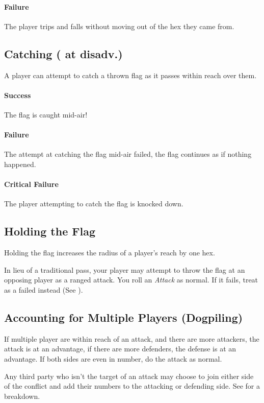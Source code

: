 \paragraph{Failure}
The player trips and falls without moving out of the hex they came from.

\subsection{Catching (\agility{} at disadv.)}\label{sec:catching}
A player can attempt to catch a thrown flag as it passes within reach over them.
\paragraph{Success}
The flag is caught mid-air!
\paragraph{Failure}
The attempt at catching the flag mid-air failed, the flag continues as if nothing happened.
\paragraph{Critical Failure}
The player attempting to catch the flag is knocked down.

\subsection{Holding the Flag}
Holding the flag increases the radius of a player's reach by one hex.

In lieu of a traditional pass, your player may attempt to throw the flag at an opposing player as a ranged attack.
You roll an \textit{Attack} as normal.
If it fails, treat as a failed \throw{} instead (See ).

\subsection{Accounting for Multiple Players (Dogpiling)}\label{dogpiling}
If multiple player are within reach of an attack, and there are more attackers, the attack is at an advantage, if there are more defenders, the defense is at an advantage. If both sides are even in number, do the attack as normal.

Any third party who isn't the target of an attack may choose to join either side of the conflict and add their numbers to the attacking or defending side.
See  for a breakdown.

